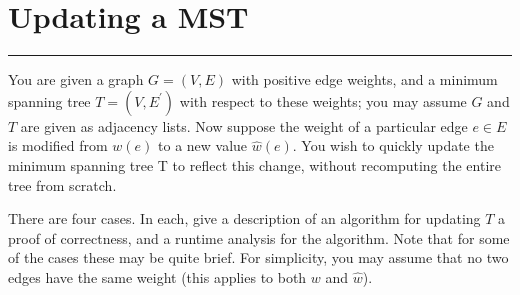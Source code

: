 \documentclass{article}
\begin{document}
\newpage
\section*{Updating a MST}
\hrule

You are given a graph $G = (V, E)$ with positive edge weights, and a minimum spanning tree $T = (V, E^{\prime})$ with respect to these weights; you may assume $G$ and $T$ are given as adjacency lists. Now suppose the weight of a particular edge $e \in E$ is modified from $w(e)$ to a new value $\hat{w}(e)$. You wish to quickly update the minimum spanning tree T to reflect this change, without recomputing the entire tree from scratch.

There are four cases. In each, give a description of an algorithm for updating $T$ a proof of correctness, and a runtime analysis for the algorithm. Note that for some of the cases these may be quite brief. For simplicity, you may assume that no two edges have the same weight (this applies to both $w$ and $\hat{w}$).
\end{document}
